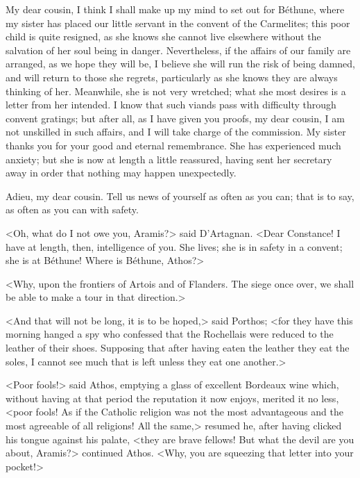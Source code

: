 \begin{mail}{}{My dear cousin,}
I think I shall make up my mind to set out for Béthune, where my sister has placed our little servant in the convent of the Carmelites; this poor child is quite resigned, as she knows she cannot live elsewhere without the salvation of her soul being in danger. Nevertheless, if the affairs of our family are arranged, as we hope they will be, I believe she will run the risk of being damned, and will return to those she regrets, particularly as she knows they are always thinking of her. Meanwhile, she is not very wretched; what she most desires is a letter from her intended. I know that such viands pass with difficulty through convent gratings; but after all, as I have given you proofs, my dear cousin, I am not unskilled in such affairs, and I will take charge of the commission. My sister thanks you for your good and eternal remembrance. She has experienced much anxiety; but she is now at length a little reassured, having sent her secretary away in order that nothing may happen unexpectedly.

Adieu, my dear cousin. Tell us news of yourself as often as you can; that is to say, as often as you can with safety. 

\end{mail}

<Oh, what do I not owe you, Aramis?> said D'Artagnan. <Dear Constance! I have at length, then, intelligence of you. She lives; she is in safety in a convent; she is at Béthune! Where is Béthune, Athos?> 

<Why, upon the frontiers of Artois and of Flanders. The siege once over, we shall be able to make a tour in that direction.> 

<And that will not be long, it is to be hoped,> said Porthos; <for they have this morning hanged a spy who confessed that the Rochellais were reduced to the leather of their shoes. Supposing that after having eaten the leather they eat the soles, I cannot see much that is left unless they eat one another.> 

<Poor fools!> said Athos, emptying a glass of excellent Bordeaux wine which, without having at that period the reputation it now enjoys, merited it no less, <poor fools! As if the Catholic religion was not the most advantageous and the most agreeable of all religions! All the same,> resumed he, after having clicked his tongue against his palate, <they are brave fellows! But what the devil are you about, Aramis?> continued Athos. <Why, you are squeezing that letter into your pocket!> 

